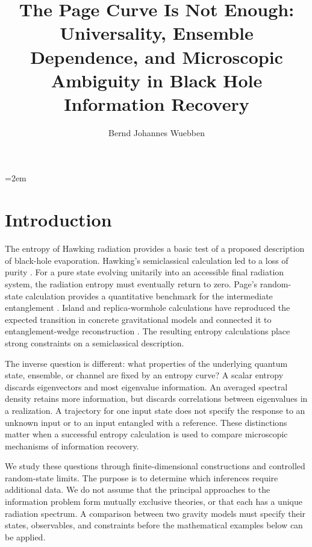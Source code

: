 \documentclass[11pt,letterpaper]{article}
\title{The Page Curve Is Not Enough:\\
Universality, Ensemble Dependence, and Microscopic Ambiguity in Black Hole
Information Recovery}
\author{Bernd Johannes Wuebben}
\affiliation{New York, NY, USA}
\theoremstyle{plain}
\theoremstyle{definition}
\theoremstyle{remark}
\begin{document}
\notoc
\maketitle

\clearpage
{}
\setcounter{page}{1}
\newpage
\tableofcontents
\newpage
{}
\setcounter{page}{1}

\emergencystretch=2em


\section{Introduction}
\label{sec01:introduction}

The entropy of Hawking radiation provides a basic test of a proposed
description of black-hole evaporation. Hawking's semiclassical
calculation led to a loss of purity \cite{hawking1976}. For a pure
state evolving unitarily into an accessible final radiation system,
the radiation entropy must eventually return to zero. Page's
random-state calculation provides a quantitative benchmark for the
intermediate entanglement \cite{page1993}. Island and replica-wormhole
calculations have reproduced the expected transition in concrete
gravitational models and connected it to entanglement-wedge
reconstruction \cite{penington2020,almheirietal2019,pssyetal2022}.
The resulting entropy calculations place strong constraints on a
semiclassical description.

The inverse question is different: what properties of the underlying
quantum state, ensemble, or channel are fixed by an entropy curve?
A scalar entropy discards eigenvectors and most eigenvalue information.
An averaged spectral density retains more information, but discards
correlations between eigenvalues in a realization. A trajectory for
one input state does not specify the response to an unknown input or
to an input entangled with a reference. These distinctions matter when
a successful entropy calculation is used to compare microscopic
mechanisms of information recovery.

We study these questions through finite-dimensional constructions and
controlled random-state limits. The purpose is to determine which
inferences require additional data. We do not assume that the principal
approaches to the information problem form mutually exclusive theories,
or that each has a unique radiation spectrum. A comparison between two
gravity models must specify their states, observables, and constraints
before the mathematical examples below can be applied.
\end{document}
